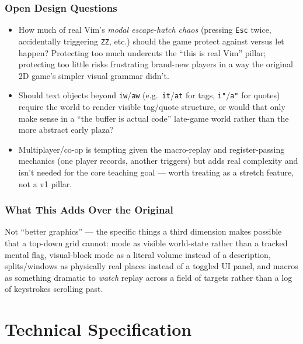 \documentclass[11pt]{article}
\providecommand{\tightlist}{%
  \setlength{\itemsep}{0pt}\setlength{\parskip}{0pt}}
\begin{document}
\hypertarget{sec-open-design-questions}{%
\section{Open Design Questions}\label{sec-open-design-questions}}

\begin{itemize}
\tightlist
\item
  How much of real Vim's \emph{modal escape-hatch chaos} (pressing \texttt{Esc} twice,
  accidentally triggering \texttt{ZZ}, etc.) should the game protect against versus
  let happen? Protecting too much undercuts the ``this is real Vim'' pillar;
  protecting too little risks frustrating brand-new players in a way the
  original 2D game's simpler visual grammar didn't.
\item
  Should text objects beyond \texttt{iw}/\texttt{aw} (e.g.~\texttt{it}/\texttt{at} for tags, \texttt{i"}/\texttt{a"} for
  quotes) require the world to render visible tag/quote structure, or would
  that only make sense in a ``the buffer is actual code'' late-game world
  rather than the more abstract early plaza?
\item
  Multiplayer/co-op is tempting given the macro-replay and register-passing
  mechanics (one player records, another triggers) but adds real complexity
  and isn't needed for the core teaching goal --- worth treating as a stretch
  feature, not a v1 pillar.
\end{itemize}

\hypertarget{sec-what-this-adds-over-the-original}{%
\section{What This Adds Over the Original}\label{sec-what-this-adds-over-the-original}}

Not ``better graphics'' --- the specific things a third dimension makes possible
that a top-down grid cannot: mode as visible world-state rather than a
tracked mental flag, visual-block mode as a literal volume instead of a
description, splits/windows as physically real places instead of a toggled
UI panel, and macros as something dramatic to \emph{watch} replay across a field
of targets rather than a log of keystrokes scrolling past.

\part{Technical Specification}
\setcounter{section}{-1}
\end{document}
